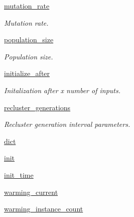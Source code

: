\begin{DoxyCompactItemize}
\hyperlink{classStreamClusteringAlgorithms_1_1evoStream_1_1v1_1_1Algorithm_1_1EvoStreamV1_1_1EvoStreamV1_a193d4b167e403f3fb27c446d03273edd}{mutation\+\_\+rate}
\begin{DoxyCompactList}\small\item\em Mutation rate. \end{DoxyCompactList}\item 
\hyperlink{classStreamClusteringAlgorithms_1_1evoStream_1_1v1_1_1Algorithm_1_1EvoStreamV1_1_1EvoStreamV1_a199eaed6b415bc040518dcc441f93d83}{population\+\_\+size}
\begin{DoxyCompactList}\small\item\em Population size. \end{DoxyCompactList}\item 
\hyperlink{classStreamClusteringAlgorithms_1_1evoStream_1_1v1_1_1Algorithm_1_1EvoStreamV1_1_1EvoStreamV1_ab86e66908b70ceb1ac38ff1708d3c45c}{initialize\+\_\+after}
\begin{DoxyCompactList}\small\item\em Initalization after x number of inputs. \end{DoxyCompactList}\item 
\hyperlink{classStreamClusteringAlgorithms_1_1evoStream_1_1v1_1_1Algorithm_1_1EvoStreamV1_1_1EvoStreamV1_ac45c8bef514493d96156a59a78af124f}{recluster\+\_\+generations}
\begin{DoxyCompactList}\small\item\em Recluster generation interval parameters. \end{DoxyCompactList}\item 
\hyperlink{classStreamClusteringAlgorithms_1_1evoStream_1_1v1_1_1Algorithm_1_1EvoStreamV1_1_1EvoStreamV1_aeda962414bb181b7032317483d8df1ad}{dict}
\item 
\hyperlink{classStreamClusteringAlgorithms_1_1evoStream_1_1v1_1_1Algorithm_1_1EvoStreamV1_1_1EvoStreamV1_a432355bc9e64785657d96f63023169ee}{init}
\item 
\hyperlink{classStreamClusteringAlgorithms_1_1evoStream_1_1v1_1_1Algorithm_1_1EvoStreamV1_1_1EvoStreamV1_a639c6ab2cd9da9fa4975cb212a305740}{init\+\_\+time}
\item 
\hyperlink{classStreamClusteringAlgorithms_1_1evoStream_1_1v1_1_1Algorithm_1_1EvoStreamV1_1_1EvoStreamV1_a0777f8aaf2a42d9c7fc6abdb2e1a7645}{warming\+\_\+current}
\item 
\hyperlink{classStreamClusteringAlgorithms_1_1evoStream_1_1v1_1_1Algorithm_1_1EvoStreamV1_1_1EvoStreamV1_a1008e3ae665d3d1a9e06ce20b21685c4}{warming\+\_\+instance\+\_\+count}

\end{DoxyCompactItemize}
